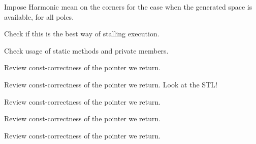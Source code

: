 \begin{DoxyRefList}
\item[\label{todo__todo000027}%
\hypertarget{todo__todo000027}{}%
Member \hyperlink{classmtk_1_1RobinBCDescriptor2D_a2f99cdd8bda2bc46cf259bb96ef4bd49}{mtk\+:\+:Robin\+B\+C\+Descriptor2\+D\+:\+:Impose\+On\+South\+Boundary\+With\+Space} (const Lap2\+D \&lap, const Uni\+Stg\+Grid2\+D \&grid, Dense\+Matrix \&matrix, const Real \&time=k\+Zero) const ]Impose Harmonic mean on the corners for the case when the generated space is available, for all poles.  
\item[\label{todo__todo000029}%
\hypertarget{todo__todo000029}{}%
Member \hyperlink{classmtk_1_1Tools_a332324c6f25e66be9dff48c5987a3b9f}{mtk\+:\+:Tools\+:\+:Prevent} (const bool complement, const char $\ast$const fname, int lineno, const char $\ast$const fxname) noexcept]Check if this is the best way of stalling execution.  
\item[\label{todo__todo000030}%
\hypertarget{todo__todo000030}{}%
Member \hyperlink{classmtk_1_1Tools_a04a60458594336ee1badff79b8a9a77f}{mtk\+:\+:Tools\+:\+:test\+\_\+number\+\_\+} ]Check usage of static methods and private members.  
\item[\label{todo__todo000007}%
\hypertarget{todo__todo000007}{}%
Member \hyperlink{classmtk_1_1UniStgGrid1D_aa1999580cb98c19950e951510871cc90}{mtk\+:\+:Uni\+Stg\+Grid1\+D\+:\+:discrete\+\_\+domain\+\_\+x} () const ]Review const-\/correctness of the pointer we return.  
\item[\label{todo__todo000008}%
\hypertarget{todo__todo000008}{}%
Member \hyperlink{classmtk_1_1UniStgGrid1D_ab9c3f9ee2ac76a351b01e4abfede4d19}{mtk\+:\+:Uni\+Stg\+Grid1\+D\+:\+:discrete\+\_\+field} ()]Review const-\/correctness of the pointer we return. Look at the S\+T\+L!  
\item[\label{todo__todo000010}%
\hypertarget{todo__todo000010}{}%
Member \hyperlink{classmtk_1_1UniStgGrid2D_ab2f70cf5cd0a2d5486992d9f2f8baa4a}{mtk\+:\+:Uni\+Stg\+Grid2\+D\+:\+:discrete\+\_\+domain\+\_\+x} () const ]Review const-\/correctness of the pointer we return.  
\item[\label{todo__todo000011}%
\hypertarget{todo__todo000011}{}%
Member \hyperlink{classmtk_1_1UniStgGrid2D_ac33a58d65105550dcf6f6b92b48b5105}{mtk\+:\+:Uni\+Stg\+Grid2\+D\+:\+:discrete\+\_\+domain\+\_\+y} () const ]Review const-\/correctness of the pointer we return.  
\item[\label{todo__todo000013}%
\hypertarget{todo__todo000013}{}%
Member \hyperlink{classmtk_1_1UniStgGrid3D_a2365ddd57304c4036a07844b952b31ad}{mtk\+:\+:Uni\+Stg\+Grid3\+D\+:\+:discrete\+\_\+domain\+\_\+x} () const ]Review const-\/correctness of the pointer we return.  

\end{DoxyRefList}

